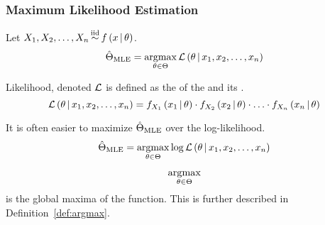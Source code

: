		\subsubsection{Maximum Likelihood Estimation} \label{subsubsec:Maximum Likelihood Estimation}
			\begin{definition} \label{def:Maximum Likelihood Estimation}
				Let $ X_{1},X_{2},\ldots,X_{n} \operatorname{\overset{\text{iid}}{\operatorname{\sim}}} f \left( x \operatorname{\vert} \theta \right) $.
				\begin{equation} \label{eq:Maximum Likelihood Estimation}
					\hat{\Theta}_{\operatorname{\text{MLE}}} = \operatorname*{argmax}_{\theta \in \Theta} \operatorname{\mathcal{L}} \left( \theta \operatorname{\vert} x_{1},x_{2},\ldots,x_{n} \right)
				\end{equation}
				\begin{remark} \label{rmk:Likelihood}
					Likelihood, denoted $\operatorname{\mathcal{L}}$ is defined as the  of the  and its .
					\begin{equation} \label{eq:Likelihood}
						\operatorname{\mathcal{L}} \left( \theta \operatorname{\vert} x_{1},x_{2},\ldots,x_{n} \right) = f_{X_{1}} \left( x_{1} \operatorname{\vert} \theta \right) \cdot f_{X_{2}} \left( x_{2} \operatorname{\vert} \theta \right) \cdot \ldots \cdot f_{X_{n}} \left( x_{n} \operatorname{\vert} \theta \right)
					\end{equation}
				\end{remark}
				\begin{remark}
					It is often easier to maximize $\hat{\Theta}_{\operatorname{\text{MLE}}}$ over the log-likelihood.
					\begin{equation*}
						\hat{\Theta}_{\operatorname{\text{MLE}}} = \operatorname*{argmax}_{\theta \in \Theta} \log \operatorname{\mathcal{L}} \left( \theta \operatorname{\vert} x_{1},x_{2},\ldots,x_{n} \right)
					\end{equation*}
				\end{remark}
				\begin{remark}
					\[ \operatorname*{argmax}_{\theta \in \Theta} \] is the global maxima of the function. This is further described in Definition~\ref{def:argmax}.
				\end{remark}
			\end{definition}
	
